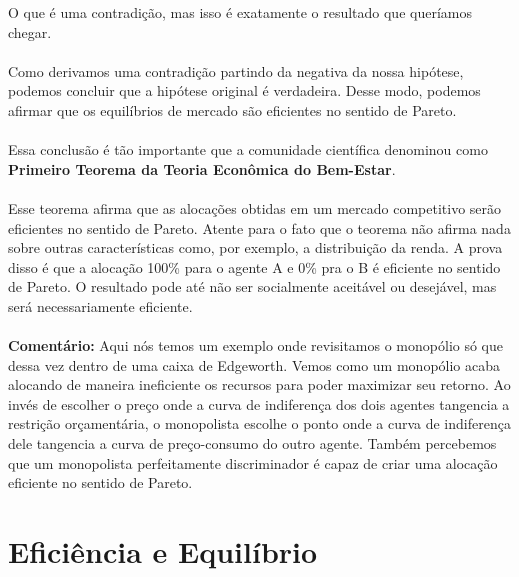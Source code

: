\documentclass[a4paper,11pt,oneside]{book}
\theoremstyle{definition}
\theoremstyle{break}
\begin{document}
O que é uma contradição, mas isso é exatamente o resultado que queríamos chegar.
\\~\\
Como derivamos uma contradição partindo da negativa da nossa hipótese, podemos concluir que a hipótese original é verdadeira. Desse modo, podemos afirmar que os equilíbrios de mercado são eficientes no sentido de Pareto.
\\~\\
Essa conclusão é tão importante que a comunidade científica denominou como \textbf{Primeiro Teorema da Teoria Econômica do Bem-Estar}.
\\~\\
Esse teorema afirma que as alocações obtidas em um mercado competitivo serão eficientes no sentido de Pareto. Atente para o fato que o teorema não afirma nada sobre outras características como, por exemplo, a distribuição da renda. A prova disso é que a alocação 100\% para o agente A e 0\% pra o B é eficiente no sentido de Pareto. O resultado pode até não ser socialmente aceitável ou desejável, mas será necessariamente eficiente.
\\~\\
\textbf{Comentário:} Aqui nós temos um exemplo onde revisitamos o monopólio só que dessa vez dentro de uma caixa de Edgeworth. Vemos como um monopólio acaba alocando de maneira ineficiente os recursos para poder maximizar seu retorno. Ao invés de escolher o preço onde a curva de indiferença dos dois agentes tangencia a restrição orçamentária, o monopolista escolhe o ponto onde a curva de indiferença dele tangencia a curva de preço-consumo do outro agente. Também percebemos que um monopolista perfeitamente discriminador é capaz de criar uma alocação eficiente no sentido de Pareto.

\section{Eficiência e Equilíbrio}
\end{document}
